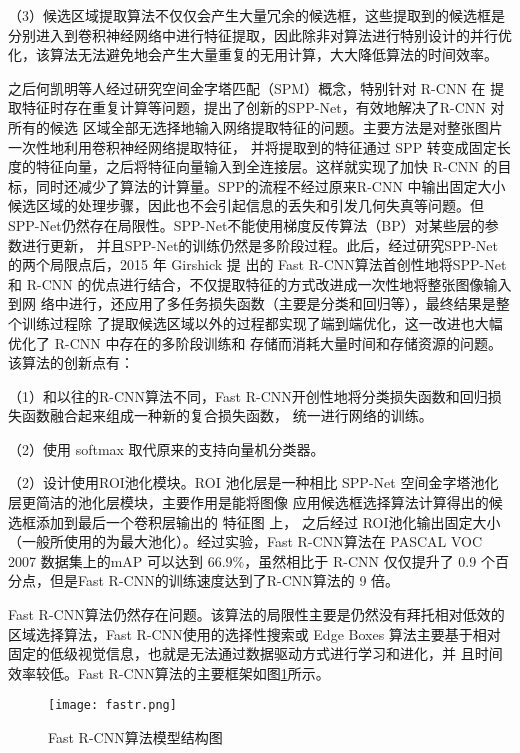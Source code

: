 （3）候选区域提取算法不仅仅会产生大量冗余的候选框，这些提取到的候选框是分别进入到卷积神经网络中进行特征提取，因此除非对算法进行特别设计的并行优化，该算法无法避免地会产生大量重复的无用计算，大大降低算法的时间效率。

之后何凯明等人经过研究空间金字塔匹配（SPM）概念，特别针对 R-CNN 在
提取特征时存在重复计算等问题，提出了创新的SPP-Net\cite{purkait2017spp}，有效地解决了R-CNN 对所有的候选
区域全部无选择地输入网络提取特征的问题。主要方法是对整张图片一次性地利用卷积神经网络提取特征，
并将提取到的特征通过 SPP 转变成固定长度的特征向量，之后将特征向量输入到全连接层。这样就实现了加快
R-CNN 的目标，同时还减少了算法的计算量。SPP的流程不经过原来R-CNN 中输出固定大小候选区域的处理步骤，因此也不会引起信息的丢失和引发几何失真等问题。但
SPP-Net仍然存在局限性。SPP-Net不能使用梯度反传算法（BP）对某些层的参数进行更新，
并且SPP-Net的训练仍然是多阶段过程。此后，经过研究SPP-Net 的两个局限点后，2015 年 Girshick 提
出的 Fast R-CNN\cite{girshick2015fast}算法首创性地将SPP-Net 和 R-CNN 的优点进行结合，不仅提取特征的方式改进成一次性地将整张图像输入到网
络中进行，还应用了多任务损失函数（主要是分类和回归等），最终结果是整个训练过程除
了提取候选区域以外的过程都实现了端到端优化，这一改进也大幅优化了 R-CNN 中存在的多阶段训练和
存储而消耗大量时间和存储资源的问题。该算法的创新点有：

（1）和以往的R-CNN算法不同，Fast R-CNN开创性地将分类损失函数和回归损失函数融合起来组成一种新的复合损失函数，
统一进行网络的训练。

（2）使用 softmax 取代原来的支持向量机分类器。

（2）设计使用ROI池化模块。ROI
池化层是一种相比 SPP-Net 空间金字塔池化层更简洁的池化层模块，主要作用是能将图像
应用候选框选择算法计算得出的候选框添加到最后一个卷积层输出的 特征图 上，
之后经过 ROI池化输出固定大小（一般所使用的为最大池化）。经过实验，Fast R-CNN算法在
PASCAL VOC 2007 数据集上的mAP 可以达到 $66.9\%$，虽然相比于 R-CNN 仅仅提升了 0.9
个百分点，但是Fast R-CNN的训练速度达到了R-CNN算法的 9 倍。

Fast R-CNN算法仍然存在问题。该算法的局限性主要是仍然没有拜托相对低效的区域选择算法，Fast R-CNN使用的选择性搜索或 Edge Boxes 算法主要基于相对固定的低级视觉信息，也就是无法通过数据驱动方式进行学习和进化，并
且时间效率较低。Fast R-CNN算法的主要框架如图\ref{fastr}所示。

\begin{figure}[htbp]
    \centering
    \texttt{[image: fastr.png]}
    \caption{Fast R-CNN算法模型结构图\cite{girshick2015fast}}
    \label{fastr}
\end{figure}

